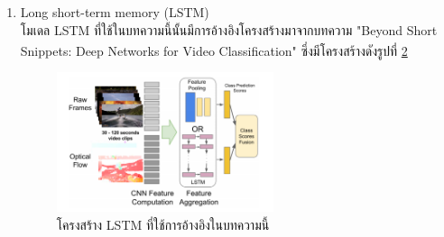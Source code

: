 \begin{enumerate}
\begin{enumerate}
\begin{enumerate}
\begin{figure}[!ht]
					\label{fig:dbof}
				\end{figure}
				\item Long short-term memory (LSTM)\\
				โมเดล LSTM ที่ใช้ในบทความนี้นั้นมีการอ้างอิงโครงสร้างมาจากบทความ "Beyond Short Snippets: Deep Networks for Video Classification"\textsuperscript{\cite{yue2015beyond}}
				ซึ่งมีโครงสร้างดังรูปที่ \ref{fig:lstm_full}
				\begin{figure}[!ht]
					\centering
					\includegraphics[width=0.6\textwidth]{chapter2/images/lstm_full.png}
					\caption{โครงสร้าง LSTM ที่ใช้การอ้างอิงในบทความนี้}
					\label{fig:lstm_full}
				\end{figure}


\end{enumerate}
\end{enumerate}
\end{enumerate}
